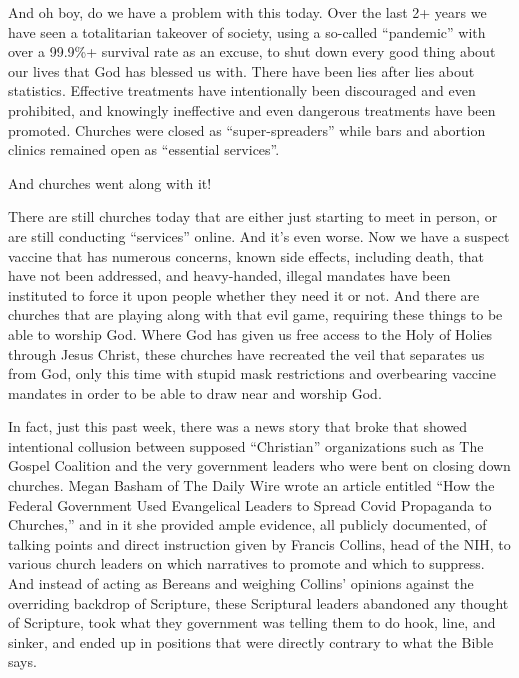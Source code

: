 \documentclass[letterpaper, 12pt]{article}
\begin{document}
    And oh boy, do we have a problem with this today. Over the last 2+
    years we have seen a totalitarian takeover of society, using a
    so-called ``pandemic'' with over a 99.9\%+ survival rate as an
    excuse, to shut down every good thing about our lives that God has
    blessed us with. There have been lies after lies about statistics.
    Effective treatments have intentionally been discouraged and even
    prohibited, and knowingly ineffective and even dangerous treatments
    have been promoted. Churches were closed as ``super-spreaders'' while bars and abortion
    clinics remained open as ``essential services''.

    And churches went along with it!

    There are still churches today that are either just starting to meet
    in person, or are still conducting ``services'' online. And it's
    even worse. Now we have a suspect vaccine that has numerous
    concerns, known side effects, including death, that have not been
    addressed, and heavy-handed, illegal mandates have been instituted
    to force it upon people whether they need it or not. And there are
    churches that are playing along with that evil game, requiring these
    things to be able to worship God.  Where God has given us free
    access to the Holy of Holies through Jesus Christ, these churches
    have recreated the veil that separates us from God, only this time
    with stupid mask restrictions and overbearing vaccine mandates in
    order to be able to draw near and worship God. 

    In fact, just this past week, there was a news story that broke that
    showed intentional collusion between supposed ``Christian''
    organizations such as The Gospel Coalition and the very government
    leaders who were bent on closing down churches. Megan Basham of The
    Daily Wire wrote an article entitled ``How the Federal Government
    Used Evangelical Leaders to Spread Covid Propaganda to Churches,''
    and in it she provided ample evidence, all publicly documented, of
    talking points and direct instruction given by Francis Collins, head
    of the NIH, to various church leaders on which narratives to promote
    and which to suppress.  And instead of acting as Bereans and
    weighing Collins' opinions against the overriding backdrop of
    Scripture, these Scriptural leaders abandoned any thought of
    Scripture, took what they government was telling them to do hook,
    line, and sinker, and ended up in positions that were directly
    contrary to what the Bible says.
\end{document}

